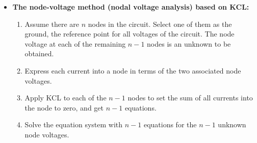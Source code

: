 \documentclass{article}
\begin{document}
\begin{itemize}
\begin{itemize}
  \item Alternatively, consider the two loop currents $I_a$ and $I_c$ 
    around loops abda and bcdb:
    \begin{eqnarray}
      \sum V_{abda}&=&-32+2(I_a+I_c)+8I_a=0
      \nonumber\\
      \sum V_{abcda}&=&-32+2(I_a+I_c)+4I_c+20=0
    \end{eqnarray}
    i.e.,
    \begin{equation}
      \left\{ \begin{array}{rrrr} 10I_a&+2I_c&=&32 \\ 2I_a &+6I_c&=&12
      \end{array} \right. 
      \begin{comment}
        \;\;\;\;\;\mbox{i.e.,}\;\;\;\;\;\;
        \left\{ \begin{array}{rrrr} 5I_a&+I_c&=&16 \\ I_a &+3I_c&=&6\end{array} \right. 
      \end{comment}
      \;\;\;\;\;\;\Longrightarrow \;\;\;\;\;
      \left\{ \begin{array}{l}
        I_a=3 \\  I_c=1 \end{array} \right. 
    \end{equation}
    and we get $I_1=I_a+I_c=4$ and $I_2=-I_c=-1$, same as the previous 
    results.

  \end{itemize}

\item {\bf The node-voltage method (nodal voltage analysis) based on KCL:}

  \begin{enumerate} 
  \item Assume there are $n$ nodes in the circuit. Select one of them 
    as the ground, the reference point for all voltages of the circuit.
    The node voltage at each of the remaining $n-1$ nodes is an unknown 
    to be obtained.
  \item Express each current into a node in terms of the two associated
    node voltages.
  \item Apply KCL to each of the $n-1$ nodes to set the sum of all
    currents into the node to zero, and get $n-1$ equations.
  \item Solve the equation system with $n-1$ equations for the $n-1$
    unknown node voltages.
  \end{enumerate}


\end{itemize}
\end{document}
